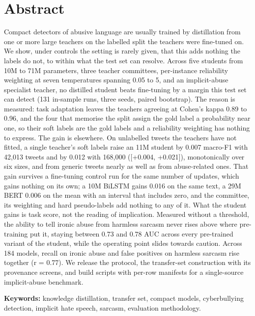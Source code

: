 \chapter*{Abstract}
Compact detectors of abusive language are usually trained by distillation from one or more large
teachers on the labelled split the teachers were fine-tuned on. We show, under controls the setting
is rarely given, that this adds nothing the labels do not, to within what the test set can resolve.
Across five students from 10M to 71M parameters, three teacher committees, per-instance reliability
weighting at seven temperatures spanning 0.05 to 5, and an implicit-abuse specialist teacher, no
distilled student beats fine-tuning by a margin this test set can detect (131 in-sample runs, three
seeds, paired bootstrap). The reason is measured: task adaptation leaves the teachers agreeing at
Cohen's kappa 0.89 to 0.96, and the four that memorise the split assign the gold label a probability
near one, so their soft labels are the gold labels and a reliability weighting has nothing to
express. The gain is elsewhere. On unlabelled tweets the teachers have not fitted, a single
teacher's soft labels raise an 11M student by 0.007 macro-F1 with 42,013 tweets and by 0.012 with
168,000 ([+0.004, +0.021]), monotonically over six sizes, and from generic tweets nearly as well as
from abuse-related ones. That gain survives a fine-tuning control run for the same number of
updates, which gains nothing on its own; a 10M BiLSTM gains 0.016 on the same text, a 29M BERT 0.006
on the mean with an interval that includes zero, and the committee, its weighting and hard
pseudo-labels add nothing to any of it. What the student gains is task score, not the reading of
implication. Measured without a threshold, the ability to tell ironic abuse from harmless sarcasm
never rises above where pre-training put it, staying between 0.73 and 0.78 AUC across every
pre-trained variant of the student, while the operating point slides towards caution. Across 184
models, recall on ironic abuse and false positives on harmless sarcasm rise together (r = 0.77). We
release the protocol, the transfer-set construction with its provenance screens, and build scripts
with per-row manifests for a single-source implicit-abuse benchmark.

\vspace{0.4cm}
\noindent\textbf{Keywords:} knowledge distillation, transfer set, compact models, cyberbullying detection, implicit hate speech, sarcasm, evaluation methodology.

